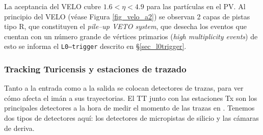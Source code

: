 La aceptancia del VELO cubre $1.6<\eta<4.9$ para las partículas en el PV. Al principio del VELO (véase Figura \ref{fig_velo_a2}) se observan 2 capas de pistas tipo R, que constituyen el \emph{pile--up VETO system}, que desecha los eventos que cuentan con un número grande de vértices primarios (\emph{high multiplicity events}) de esto se informa el \texttt{L0--trigger} descrito en \S \ref{sec_l0trigger}. 





\subsubsection{Tracking Turicensis y estaciones de trazado} %

Tanto a la entrada como a la salida se colocan detectores de trazas, para ver cómo afecta el imán a sus trayectorias. El TT junto con las estaciones Tx son los principales detectores a la hora de medir el momento de las trazas en \lhcb \cite{Alves:1129809}. Tenemos dos tipos de detectores aquí: los detectores de micropistas de silicio y las cámaras de deriva.

